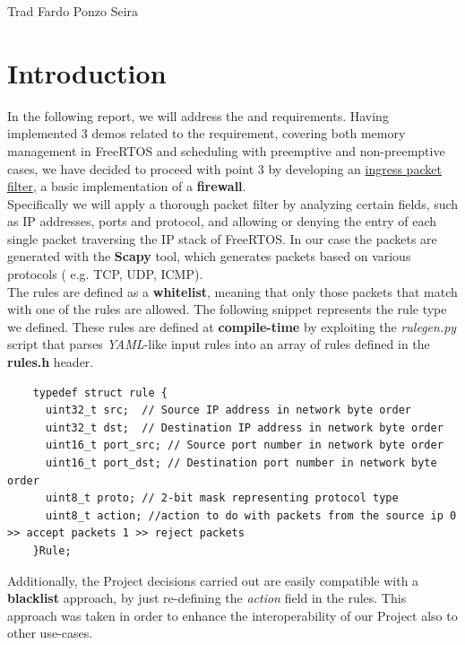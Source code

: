 \documentclass{exam}
\begin{document}
\begin{titlepage}
	\center 



 

 
	\LoggaSwe     


 

     {Trad}
     {Fardo}
	 {Ponzo}
	 {Seira}
        
	\vfill
\end{titlepage}

\pagebreak
\tableofcontents
\pagebreak

\section{Introduction}

In the following report, we will address the  and  requirements. Having implemented 3 demos related to the  requirement, covering both memory management in FreeRTOS and scheduling with preemptive and non-preemptive cases, we have decided to proceed with point 3 by developing an \underline{ingress packet filter}, a basic implementation of a \textbf{firewall}.
\\Specifically we will apply a thorough packet filter by analyzing certain fields, such as IP addresses, ports and protocol, and allowing or denying the entry of each single packet traversing the IP stack of FreeRTOS. In our case the packets are generated with the \textbf{Scapy} tool, which generates packets based on various protocols ( e.g. TCP, UDP, ICMP).
\\The rules are defined as a \textbf{whitelist}, meaning that only those packets that match with one of the rules are allowed. The following snippet represents the rule type we defined. These rules are defined at \textbf{compile-time} by exploiting the \textit{rulegen.py} script that parses \textit{YAML}-like input rules into an array of rules defined in the \textbf{rules.h} header.
\begin{lstlisting}
    typedef struct rule {
      uint32_t src;  // Source IP address in network byte order
      uint32_t dst;  // Destination IP address in network byte order
      uint16_t port_src; // Source port number in network byte order
      uint16_t port_dst; // Destination port number in network byte order
      uint8_t proto; // 2-bit mask representing protocol type
      uint8_t action; //action to do with packets from the source ip 0 >> accept packets 1 >> reject packets
    }Rule;
\end{lstlisting}
Additionally, the Project decisions carried out are easily compatible with a \textbf{blacklist} approach, by just re-defining the \textit{action} field in the rules. This approach was taken in order to enhance the interoperability of our Project also to other use-cases.
\end{document}
